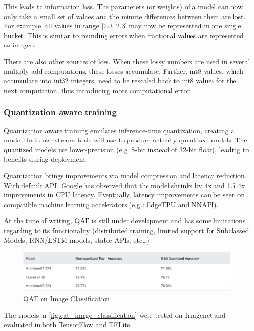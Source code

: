 This leads to information loss. The parameters (or weights) of a model can now
only take a small set of values and the minute differences between them are
lost. For example, all values in range [2.0, 2.3] may now be represented in one
single bucket. This is similar to rounding errors when fractional values are
represented as integers.

There are also other sources of loss. When these lossy numbers are used in
several multiply-add computations, these losses accumulate. Further, int8
values, which accumulate into int32 integers, need to be rescaled back to int8
values for the next computation, thus introducing more computational
error.~\cite{tfmot:quantization_blog}

\subsubsection{Quantization aware training}
Quantization aware training emulates inference-time quantization, creating a
model that downstream tools will use to produce actually quantized models. The
quantized models use lower-precision (e.g. 8-bit instead of 32-bit float),
leading to benefits during deployment.

Quantization brings improvements via model compression and latency reduction.
With default API, Google has observed that the model shrinks by 4x and 1.5 \-
4x improvements in CPU latency. Eventually, latency improvements can be seen on
compatible machine learning accelerators (e.g.: EdgeTPU and NNAPI).

At the time of writing, QAT is still under development and has some limitations
regarding to its functionality (distributed training, limited support for
Subclassed Models, RNN/LSTM models, stable APIs, etc\ldots)

\begin{figure}[ht]
    \includegraphics[width=\textwidth]{images/introduction/qat_image_classification.png}
    \centering
    \caption{QAT on Image Classification}\label{fig:qat_image_classification}
\end{figure}

The models in \autoref{fig:qat_image_classification} were tested on Imagenet
and evaluated in both TensorFlow and TFLite.

